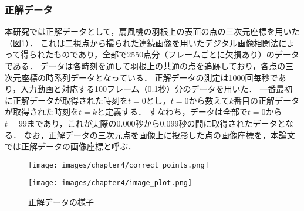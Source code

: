 \begin{comment}
\begin{figure}[h]
	\centering
	\begin{minipage}[t]{0.45\hsize}
		\centering
		
		\texttt{[image: images/chapter4/input\_data000.png]}
		\subcaption{$t=0$}
		\label{fig:input_image0}
		
	\end{minipage}
	\begin{minipage}[t]{0.45\hsize}
		\centering
		
		\texttt{[image: images/chapter4/input\_images.png]}
		\label{fig:input_images}
	\end{minipage}
	\caption[動的物体のセグメンテーション]{入力画像}
	\label{fig:input}
\end{figure}
\end{comment}

\subsubsection{正解データ}\label{subsubsec:correct_data}

本研究では正解データとして，扇風機の羽根上の表面の点の三次元座標を用いた（図\ref{fig:correct_points}）．
これは二視点から撮られた連続画像を用いたデジタル画像相関法によって得られたものであり，全部で2550点分（フレームごとに欠損あり）のデータである．
データは各時刻を通して羽根上の共通の点を追跡しており，各点の三次元座標の時系列データとなっている．
正解データの測定は1000回毎秒であり，入力動画と対応する100フレーム（0.1秒）分のデータを用いた．
一番最初に正解データが取得された時刻を$t=0$とし，$t=0$から数えて$k$番目の正解データが取得された時刻を$t=k$と定義する．
すなわち，データは全部で$t=0$から$t=99$まであり，これが実際の0.000秒から0.099秒の間に取得されたデータとなる．
なお，正解データの三次元点を画像上に投影した点の画像座標を，本論文では正解データの画像座標と呼ぶ．

\begin{figure}[h]
	\centering
	\begin{minipage}[c]{0.7\hsize}
		\centering
		\texttt{[image: images/chapter4/correct\_points.png]}
		\label{fig:correct_points3D}
		
	\end{minipage}
	\begin{minipage}[c]{0.25\hsize}
		\centering
		
		\texttt{[image: images/chapter4/image\_plot.png]}
		\label{fig:plot_image}
	\end{minipage}
	\caption[正解データの様子]{正解データの様子}
	\label{fig:correct_points}
\end{figure}

